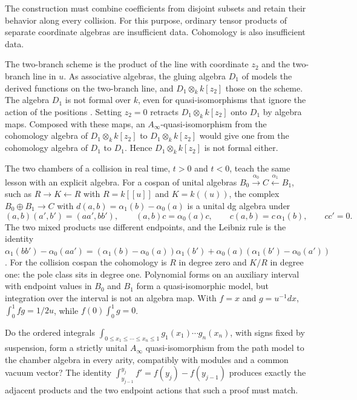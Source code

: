 The construction must combine coefficients from disjoint subsets and retain their behavior along every collision.
For this purpose, ordinary tensor products of separate coordinate algebras are insufficient data.
Cohomology is also insufficient data.

The two-branch scheme is the product of the line with coordinate \(z_2\) and the two-branch line in \(u\).
As associative algebras, the gluing algebra \(D_1\) of \cite[Chapter~15]{S:R} models the derived functions on the two-branch line, and \(D_1\otimes_kk[z_2]\) those on the scheme.
The algebra \(D_1\) is not formal over \(k\), even for quasi-isomorphisms that ignore the action of the positions \cite[Theorem~15.5.4]{S:R}.
Setting \(z_2=0\) retracts \(D_1\otimes_kk[z_2]\) onto \(D_1\) by algebra maps.
Composed with these maps, an \(A_\infty\)-quasi-isomorphism from the cohomology algebra of \(D_1\otimes_kk[z_2]\) to \(D_1\otimes_kk[z_2]\) would give one from the cohomology algebra of \(D_1\) to \(D_1\).
Hence \(D_1\otimes_kk[z_2]\) is not formal either.

The\label{ogd:def:chamber-differential} two chambers of a collision in real time, $t>0$ and $t<0$, teach the same
lesson with an explicit algebra. For a cospan of unital algebras
$B_0\xrightarrow{\alpha_0}C\xleftarrow{\alpha_1}B_1$, such as $R\to K\leftarrow R$ with
$R=k[[u]]$ and $K=k((u))$, the complex $B_0\oplus B_1\to C$ with
$d(a,b)=\alpha_1(b)-\alpha_0(a)$ is a unital dg algebra under
\[
 (a,b)(a',b')=(aa',bb'),\qquad (a,b)c=\alpha_0(a)c,\qquad c(a,b)=c\,\alpha_1(b),\qquad cc'=0 .
\]
The two mixed products use different endpoints, and the Leibniz rule is the
identity $\alpha_1(bb')-\alpha_0(aa')=(\alpha_1(b)-\alpha_0(a))\alpha_1(b')+\alpha_0(a)(\alpha_1(b')-\alpha_0(a'))$.
For the collision cospan the cohomology is $R$ in degree zero and $K/R$ in degree
one: the pole class sits in degree one. Polynomial forms on an auxiliary interval
with endpoint values in $B_0$ and $B_1$ form a quasi-isomorphic model, but
integration over the interval is not an algebra map. With $f=x$ and $g=u^{-1}dx$,
$\int_0^1fg=1/2u$, while $f(0)\int_0^1g=0$.

\begin{question}\label{ogd:qn:chamber}
Do the ordered integrals $\int_{0\le x_1\le\cdots\le x_n\le1}g_1(x_1)\cdots g_n(x_n)$, with
signs fixed by suspension, form a strictly unital $A_\infty$ quasi-isomorphism from the path
model to the chamber algebra in every arity, compatibly with modules and a common
vacuum vector? The identity $\int_{y_{j-1}}^{y_j}f'=f(y_j)-f(y_{j-1})$ produces exactly the
adjacent products and the two endpoint actions that such a proof must match.
\end{question}

